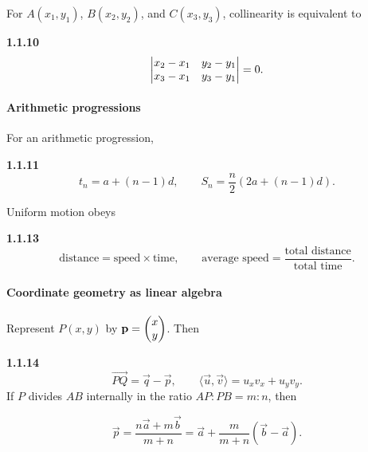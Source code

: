 \setcounter{enumii}{10}\setcounter{equation}{0}
For $A(x_1,y_1)$, $B(x_2,y_2)$, and $C(x_3,y_3)$, collinearity is equivalent to

\par\noindent\textbf{1.1.10}\quad
\begin{equation}
\begin{vmatrix}x_2-x_1&y_2-y_1\\x_3-x_1&y_3-y_1\end{vmatrix}=0.
\label{eq:collinear-det}
\end{equation}

\paragraph*{Arithmetic progressions}
\setcounter{enumii}{11}\setcounter{equation}{0}
For an arithmetic progression,
\par\noindent\textbf{1.1.11}\quad
\begin{equation}
 t_n=a+(n-1)d,\qquad S_n=\frac n2\left(2a+(n-1)d\right).\tag{1.1.11.1}\label{eq:ap-question-11}
\end{equation}

Uniform motion obeys

\setcounter{enumii}{13}\setcounter{equation}{0}
\par\noindent\textbf{1.1.13}\quad
\begin{equation}
\text{distance}=\text{speed}\times\text{time},\qquad
\text{average speed}=\frac{\text{total distance}}{\text{total time}}.
\label{eq:speed-time}
\end{equation}

\setcounter{enumii}{14}\setcounter{equation}{0}
\paragraph*{Coordinate geometry as linear algebra}
Represent $P(x,y)$ by $\mathbf p=\begin{pmatrix}x\\y\end{pmatrix}$. Then

\par\noindent\textbf{1.1.14}\quad
\begin{equation}
\overrightarrow{PQ}=\vec q-\vec p,\qquad
\langle\vec u,\vec v\rangle=u_xv_x+u_yv_y.
\label{eq:vector-basics}
\end{equation}
\setcounter{enumii}{14}\setcounter{equation}{1}
If $P$ divides $AB$ internally in the ratio $AP:PB=m:n$, then



\begin{equation}
\vec p=\frac{n\vec a+m\vec b}{m+n}=\vec a+\frac{m}{m+n}(\vec b-\vec a).
\label{eq:section-vector}
\end{equation}

